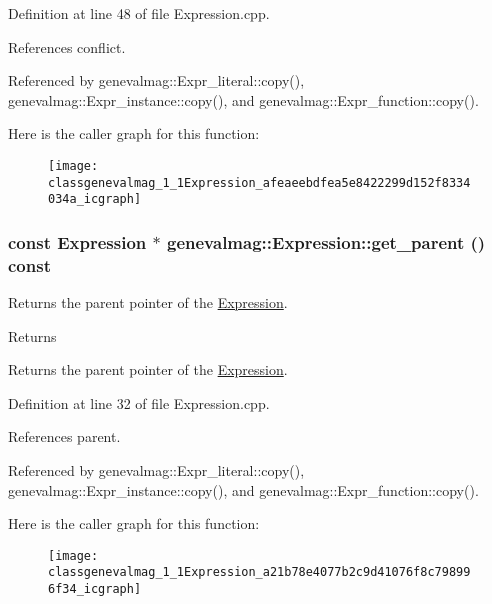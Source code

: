 Definition at line 48 of file Expression.cpp.



References conflict.



Referenced by genevalmag::Expr\_\-literal::copy(), genevalmag::Expr\_\-instance::copy(), and genevalmag::Expr\_\-function::copy().



Here is the caller graph for this function:\nopagebreak
\begin{figure}[H]
\begin{center}
\leavevmode
\texttt{[image: classgenevalmag\_1\_1Expression\_afeaeebdfea5e8422299d152f8334034a\_icgraph]}
\end{center}
\end{figure}


\hypertarget{classgenevalmag_1_1Expression_a21b78e4077b2c9d41076f8c798996f34}{
\subsubsection[{get\_\-parent}]{\setlength{\rightskip}{0pt plus 5cm}const {\bf Expression} $\ast$ genevalmag::Expression::get\_\-parent () const}}
\label{classgenevalmag_1_1Expression_a21b78e4077b2c9d41076f8c798996f34}
Returns the parent pointer of the \hyperlink{classgenevalmag_1_1Expression}{Expression}. \begin{DoxyReturn}{Returns}

\end{DoxyReturn}
Returns the parent pointer of the \hyperlink{classgenevalmag_1_1Expression}{Expression}. 

Definition at line 32 of file Expression.cpp.



References parent.



Referenced by genevalmag::Expr\_\-literal::copy(), genevalmag::Expr\_\-instance::copy(), and genevalmag::Expr\_\-function::copy().



Here is the caller graph for this function:\nopagebreak
\begin{figure}[H]
\begin{center}
\leavevmode
\texttt{[image: classgenevalmag\_1\_1Expression\_a21b78e4077b2c9d41076f8c798996f34\_icgraph]}
\end{center}
\end{figure}


